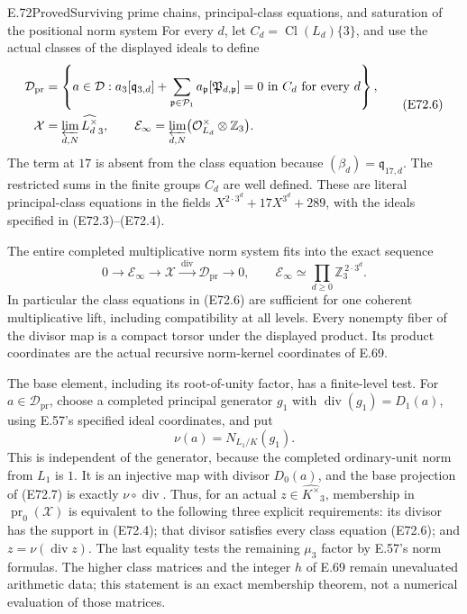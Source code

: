 \begin{statement}{E.72}{Proved}{Surviving prime chains, principal-class equations, and saturation of the positional norm system}
For every $d$, let $C_d=\operatorname{Cl}(L_d)\{3\}$, and use
the actual classes of the displayed ideals to define
\[
 \begin{split}
 \mathcal D_{\mathrm{pr}}
   &=\left\{a\in\mathcal D:
       a_3[\mathfrak q_{3,d}]
       +\sum_{\mathfrak p\in\mathcal P_1}
                  a_{\mathfrak p}[\mathfrak P_{d,\mathfrak p}]=0
                       \text{ in }C_d\text{ for every }d\right\},\\
 \mathcal X&=\varprojlim_{d,N}\widehat{L_d^\times}_3,\qquad
 \mathcal E_\infty=
       \varprojlim_{d,N}
                   \bigl(\mathcal O_{L_d}^{\times}\otimes\mathbb Z_3\bigr).
 \end{split}
 \tag{E72.6}
\]
The term at $17$ is absent from the class equation because
$(\beta_d)=\mathfrak q_{17,d}$. The restricted sums in the finite
groups $C_d$ are well defined. These are literal principal-class
equations in the fields
$X^{2\cdot3^d}+17X^{3^d}+289$, with the ideals specified in
(E72.3)--(E72.4).

The entire completed multiplicative norm system fits into the
exact sequence
\[
 0\longrightarrow\mathcal E_\infty
  \longrightarrow\mathcal X
  \xrightarrow{\ \operatorname{div}\ }\mathcal D_{\mathrm{pr}}
  \longrightarrow0,\qquad
 \mathcal E_\infty\simeq
                  \prod_{d\ge0}\mathbb Z_3^{\,2\cdot3^d}.
 \tag{E72.7}
\]
In particular the class equations in (E72.6) are sufficient for
one coherent multiplicative lift, including compatibility at all
levels. Every nonempty fiber of the divisor map is a compact
torsor under the displayed product. Its product coordinates are
the actual recursive norm-kernel coordinates of E.69.

The base element, including its root-of-unity factor, has a
finite-level test. For $a\in\mathcal D_{\mathrm{pr}}$, choose a
completed principal generator $g_1$ with
$\operatorname{div}(g_1)=D_1(a)$, using E.57's specified ideal
coordinates, and put
\[
                    \nu(a)=N_{L_1/K}(g_1).
 \tag{E72.8}
\]
This is independent of the generator, because the completed
ordinary-unit norm from $L_1$ is $1$. It is an injective map with
divisor $D_0(a)$, and the base projection of (E72.7) is exactly
$\nu\circ\operatorname{div}$. Thus, for an actual
$z\in\widehat{K^\times}_3$, membership in
$\operatorname{pr}_0(\mathcal X)$ is equivalent to the following
three explicit requirements: its divisor has the support in
(E72.4); that divisor satisfies every class equation (E72.6);
and $z=\nu(\operatorname{div}z)$. The last equality tests the
remaining $\mu_3$ factor by E.57's norm formulas. The higher
class matrices and the integer $h$ of E.69 remain unevaluated
arithmetic data; this statement is an exact membership theorem,
not a numerical evaluation of those matrices.


\end{statement}
